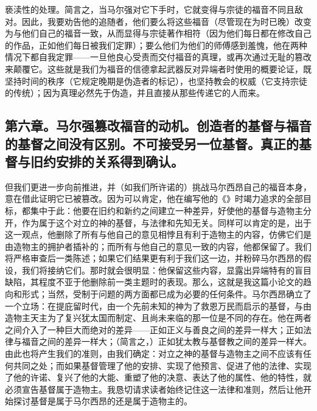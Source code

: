 亵渎性的处理。简言之，当马尔强对它下手时，它就变得与宗徒的福音不同且敌对。因此，我要劝告他的追随者，他们要么将这些福音（尽管现在为时已晚）改变为与他们自己的福音一致，从而显得与宗徒著作相符（因为他们每日都在修改自己的作品，正如他们每日被我们定罪）；要么他们为他们的师傅感到羞愧，他在两种情况下都自我定罪——一旦他良心受责而交付福音的真理，或再次通过无耻的篡改来颠覆它。这些就是我们为福音的信德拿起武器反对异端者时使用的概要论证，既坚持时间的秩序（它规定晚期是伪造者的标记），也坚持教会的权威（它支持宗徒的传统）；因为真理必然先于伪造，并且直接从那些传递它的人而来。\par


\subsection{第六章。马尔强篡改福音的动机。创造者的基督与福音的基督之间没有区别。不可接受另一位基督。真正的基督与旧约安排的关系得到确认。}

但我们更进一步向前推进，并（如我们所许诺的）挑战马尔西昂自己的福音本身，意在借此证明它已被篡改。因为可以肯定，他在编写他的《》时竭力追求的全部目标，都集中于此：他要在旧约和新约之间建立一种差异，好使他的基督与造物主分开，作为属于这个对立的神的基督，与法律和先知无关。同样可以肯定的是，出于这一观点，他删除了所有与他自己的意见相悖且有利于造物主的内容，仿佛它们是由造物主的拥护者插补的；而所有与他自己的意见一致的内容，他都保留了。我们将严格审查后一类陈述；如果它们结果更有利于我们这一边，并粉碎马尔西昂的假设，我们将接纳它们。那时就会很明显：他保留这些内容，显露出异端特有的盲目缺陷，其程度不亚于他删除前一类主题时的表现。那么，这就是我这篇小论文的趋向和形式；当然，受制于问题的两方面都已成为必要的任何条件。马尔西昂确立了一个立场：在提庇留时代，由一个先前未知的神为了救恩万民而启示的基督，与由造物主天主为了复兴犹太国而制定、且尚未来临的那一位是不同的存在。他在两者之间介入了一种巨大而绝对的差异——正如正义与善良之间的差异一样大；正如法律与福音之间的差异一样大；（简言之，）正如犹太教与基督教之间的差异一样大。由此也将产生我们的准则，由我们确定：对立之神的基督与造物主之间不应该有任何共同之处；而如果基督管理了他的安排、实现了他预言、促进了他的法律、实现了他的许诺、复兴了他的大能、重塑了他的决意、表达了他的属性、他的特性，就必须宣告基督属于造物主。我恳切请求读者始终记住这一法律和准则，然后让他开始探讨基督是属于马尔西昂的还是属于造物主的。\par


